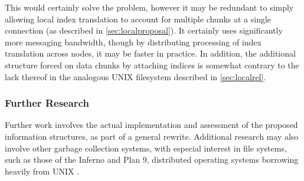 This would certainly solve the problem, however it may be redundant to
simply allowing local index translation to account for multiple chunks
at a single connection (as described in \cref{sec:localproposal}). It certainly uses significantly more
messaging bandwidth, though by distributing processing of index
translation across nodes, it may be faster in practice. In addition, the
additional structure forced on data chunks by attaching indices is
somewhat contrary to the lack thereof in the analogous UNIX
filesystem described in \cref{sec:localrel}.

\subsubsection{Further Research}\label{further-research}

Further work involves the actual implementation and assessment of the
proposed information structures, as part of a general rewrite.
Additional research may also involve other garbage collection systems,
with especial interest in file systems, such as those of the Inferno and
Plan 9, distributed operating systems borrowing heavily from
UNIX \cites{dorward1997inferno,pike1995plan}.
